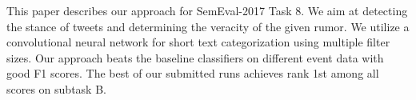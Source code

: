 This paper describes our approach for SemEval-2017 Task 8. We aim at detecting the stance of tweets and determining the veracity of the given rumor. We utilize a convolutional neural network for short text categorization using multiple filter sizes. Our approach beats the baseline classifiers on different event data with good F1 scores. The best of our submitted runs achieves rank 1st among all scores on subtask B.
